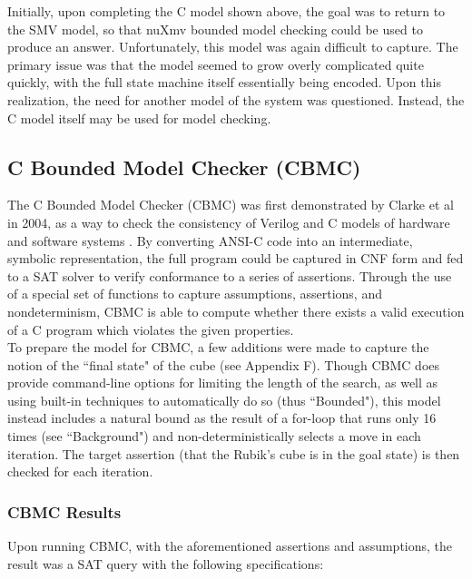 \documentclass{article}
\begin{document}
\noindent Initially, upon completing the C model shown above, the goal was to return to the SMV model, so that nuXmv bounded model checking could be used to produce an answer. Unfortunately, this model was again difficult to capture. The primary issue was that the model seemed to grow overly complicated quite quickly, with the full state machine itself essentially being encoded. Upon this realization, the need for another model of the system was questioned. Instead, the C model itself may be used for model checking.

\subsection {C Bounded Model Checker (CBMC)}

The C Bounded Model Checker (CBMC) was first demonstrated by Clarke et al in 2004, as a way to check the consistency of Verilog and C models of hardware and software systems \cite{clarke}. By converting ANSI-C code into an intermediate, symbolic representation, the full program could be captured in CNF form and fed to a SAT solver to verify conformance to a series of assertions. Through the use of a special set of functions to capture assumptions, assertions, and nondeterminism, CBMC is able to compute whether there exists a valid execution of a C program which violates the given properties. \\

\noindent To prepare the model for CBMC, a few additions were made to capture the notion of the ``final state" of the cube (see Appendix F). Though CBMC does provide command-line options for limiting the length of the search, as well as using built-in techniques to automatically do so (thus ``Bounded"), this model instead includes a natural bound as the result of a for-loop that runs only 16 times (see ``Background") and non-deterministically selects a move in each iteration. The target assertion (that the Rubik's cube is in the goal state) is then checked for each iteration. 


\subsubsection {CBMC Results}

Upon running CBMC, with the aforementioned assertions and assumptions, the result was a SAT query with the following specifications:
\end{document}
